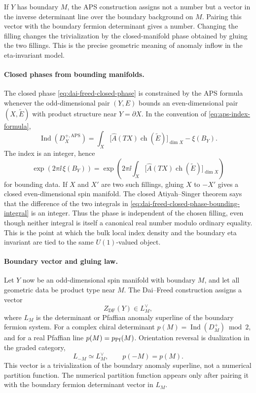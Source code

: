 If \(Y\) has boundary \(M\), the APS construction assigns not a number but a
vector in the inverse determinant line over the boundary background on \(M\).
Pairing this vector with the boundary fermion determinant gives a number.
Changing the filling changes the trivialization by the closed-manifold phase
obtained by gluing the two fillings.  This is the precise geometric meaning
of anomaly inflow in the eta-invariant model.

\paragraph{Closed phases from bounding manifolds.}
The closed phase \eqref{eq:dai-freed-closed-phase} is constrained by the APS
formula whenever the odd-dimensional pair \((Y,E)\) bounds an even-dimensional
pair \((X,\widetilde E)\) with product structure near \(Y=\partial X\).  In
the convention of \eqref{eq:aps-index-formula},
\[
  \operatorname{Ind}(D_X^{+,\mathrm{APS}})
  =
  \int_X
  \bigl[\widehat A(TX)\operatorname{ch}(\widetilde E)\bigr]_{\dim X}
  -
  \xi(B_Y).
\]
The index is an integer, hence
\begin{equation}
  \exp\!\left(2\pi\ii\,\xi(B_Y)\right)
  =
  \exp\!\left(
    2\pi\ii
    \int_X
    \bigl[\widehat A(TX)\operatorname{ch}(\widetilde E)\bigr]_{\dim X}
  \right)
  \label{eq:dai-freed-closed-phase-bounding-integral}
\end{equation}
for bounding data.  If \(X\) and \(X'\) are two such fillings, gluing
\(X\) to \(-X'\) gives a closed even-dimensional spin manifold.  The closed
Atiyah--Singer theorem says that the difference of the two integrals in
\eqref{eq:dai-freed-closed-phase-bounding-integral} is an integer.  Thus the
phase is independent of the chosen filling, even though neither integral is
itself a canonical real number modulo ordinary equality.  This is the point
at which the bulk local index density and the boundary eta invariant are tied
to the same \(U(1)\)-valued object.

\paragraph{Boundary vector and gluing law.}
Let \(Y\) now be an odd-dimensional spin manifold with boundary \(M\), and
let all geometric data be product type near \(M\).  The Dai--Freed
construction assigns a vector
\[
  Z_{\mathrm{DF}}(Y)
  \in
  L_M^\vee,
\]
where \(L_M\) is the determinant or Pfaffian anomaly superline of the
boundary fermion system.  For a complex chiral determinant
\(p(M)=\operatorname{Ind}(D_M^+)\bmod2\), and for a real Pfaffian line
\(p(M)=p_{\rm Pf}(M)\).  Orientation reversal is dualization in the graded
category,
\begin{equation}
  L_{-M}\simeq L_M^\vee,
  \qquad
  p(-M)=p(M).
  \label{eq:graded-orientation-reversal-dual}
\end{equation}
This vector is a trivialization of the boundary anomaly superline, not a
numerical partition function.  The numerical partition function appears only
after pairing it with the boundary fermion determinant vector in \(L_M\).

